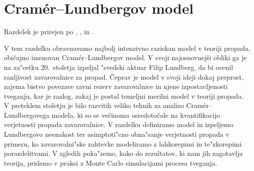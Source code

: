 \documentclass[12pt, a4paper, reqno]{amsart}
\theoremstyle{definition}
\theoremstyle{plain}
\newcommand{\R}{\mathbb{R}}
\newcommand{\1}{\mathds{1}}
\begin{document}
%
%

    \newpage

\section{Cramér--Lundbergov model}
    \noindent
    Razdelek je prirejen po \cite{3}, \cite{4},  \cite{5} in \cite{9}.

    V tem razdelku obravnavamo najbolj intenzivno raziskan model v teoriji propada, običajno imenovan 
    Cramér--Lundbergov model. V svoji najosnovnejši obliki 
    ga je na za"cetku 20.\ stoletja izpeljal "svedski aktuar Filip Lundberg, da bi ocenil ranljivost 
    zavarovalnice za propad. Čeprav je model v svoji ideji dokaj preprost, 
     zajema bistvo povezave ravni rezerv zavarovalnice in njene izpostavljenosti tveganju, 
    kar je razlog, zakaj je postal temeljni merilni model v teoriji propada.
    V preteklem stoletju je bilo razvitih veliko tehnik za analizo Cramér--Lundbergovega modela, 
    ki so se večinoma osredotočale na kvantifikacijo verjetnosti propada zavarovalnice. V razdelku definiramo 
    model in izpeljemo Lundbergovo neenakost ter asimptoti"cno obna"sanje verjetnosti propada v primeru, ko 
    zavarovalni"ske zahtevke modeliramo z lahkorepimi in te"zkorepimi porazdelitvami. V zgledih 
    poka"zemo, kako do rezultatov, ki nam jih zagotavlja teorija, pridemo v praksi z Monte Carlo 
    simulacijami procesa tveganja.
\end{document}
